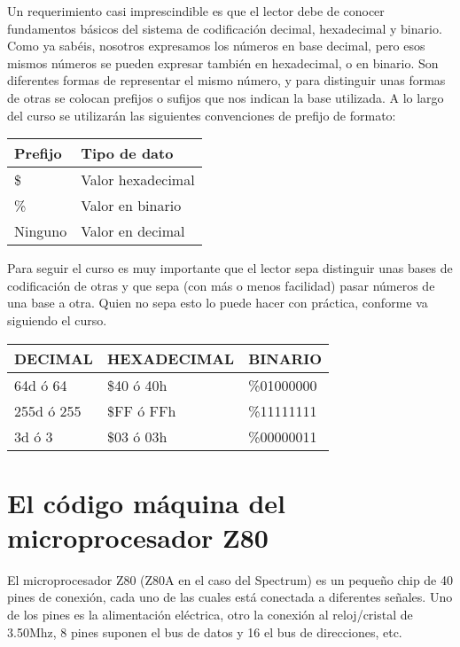 \documentclass[letterpaper,10pt,spanish]{sphinxmanual}
\begin{document}
Un requerimiento casi imprescindible es que el lector debe de conocer fundamentos básicos del sistema de codificación decimal, hexadecimal y binario. Como ya sabéis, nosotros expresamos los números en base decimal, pero esos mismos números se pueden expresar también en hexadecimal, o en binario. Son diferentes formas de representar el mismo número, y para distinguir unas formas de otras se colocan prefijos o sufijos que nos indican la base utilizada. A lo largo del curso se utilizarán las siguientes convenciones de prefijo de formato:


\begin{savenotes}\sphinxattablestart
\centering
\begin{tabulary}{\linewidth}[t]{|T|T|}
\hline
\sphinxstyletheadfamily 
Prefijo
&\sphinxstyletheadfamily 
Tipo de dato
\\
\hline
\$
&
Valor hexadecimal
\\
\hline
\%
&
Valor en binario
\\
\hline
Ninguno
&
Valor en decimal
\\
\hline
\end{tabulary}
\par
\sphinxattableend\end{savenotes}

Para seguir el curso es muy importante que el lector sepa distinguir unas bases de codificación de otras y que sepa (con más o menos facilidad) pasar números de una base a otra. Quien no sepa esto lo puede hacer con práctica, conforme va siguiendo el curso.


\begin{savenotes}\sphinxattablestart
\centering
\begin{tabulary}{\linewidth}[t]{|T|T|T|}
\hline
\sphinxstyletheadfamily 
DECIMAL
&\sphinxstyletheadfamily 
HEXADECIMAL
&\sphinxstyletheadfamily 
BINARIO
\\
\hline
64d ó 64
&
\$40 ó 40h
&
\%01000000
\\
\hline
255d ó 255
&
\$FF ó FFh
&
\%11111111
\\
\hline
3d ó 3
&
\$03 ó 03h
&
\%00000011
\\
\hline
\end{tabulary}
\par
\sphinxattableend\end{savenotes}


\section{El código máquina del microprocesador Z80}
\label{\detokenize{02_introduccion/introduccion:el-codigo-maquina-del-microprocesador-z80}}
El microprocesador Z80 (Z80A en el caso del Spectrum) es un pequeño chip de 40 pines de conexión, cada uno de las cuales está conectada a diferentes señales. Uno de los pines es la alimentación eléctrica, otro la conexión al reloj/cristal de 3.50Mhz, 8 pines suponen el bus de datos y 16 el bus de direcciones, etc.
\end{document}
